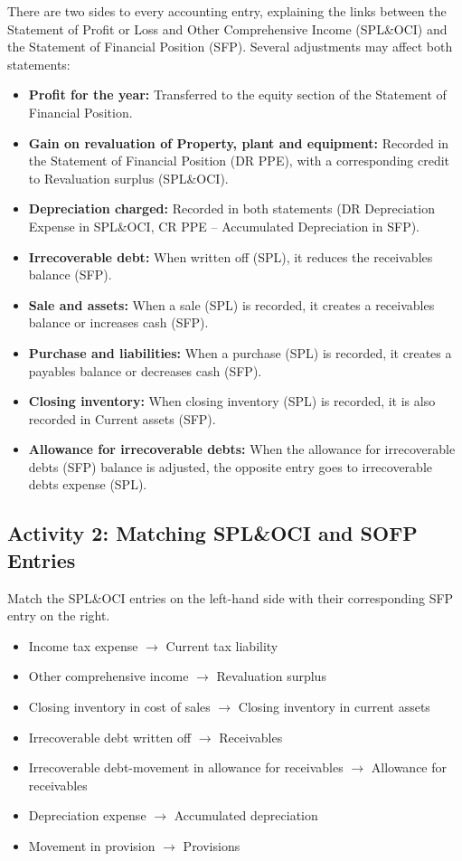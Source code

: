 There are two sides to every accounting entry, explaining the links between the Statement of Profit or Loss and Other Comprehensive Income (SPL\&OCI) and the Statement of Financial Position (SFP). Several adjustments may affect both statements:
\begin{itemize}
    \item \textbf{Profit for the year:} Transferred to the equity section of the Statement of Financial Position.
    \item \textbf{Gain on revaluation of Property, plant and equipment:} Recorded in the Statement of Financial Position (DR PPE), with a corresponding credit to Revaluation surplus (SPL\&OCI).
    \item \textbf{Depreciation charged:} Recorded in both statements (DR Depreciation Expense in SPL\&OCI, CR PPE – Accumulated Depreciation in SFP).
    \item \textbf{Irrecoverable debt:} When written off (SPL), it reduces the receivables balance (SFP).
    \item \textbf{Sale and assets:} When a sale (SPL) is recorded, it creates a receivables balance or increases cash (SFP).
    \item \textbf{Purchase and liabilities:} When a purchase (SPL) is recorded, it creates a payables balance or decreases cash (SFP).
    \item \textbf{Closing inventory:} When closing inventory (SPL) is recorded, it is also recorded in Current assets (SFP).
    \item \textbf{Allowance for irrecoverable debts:} When the allowance for irrecoverable debts (SFP) balance is adjusted, the opposite entry goes to irrecoverable debts expense (SPL).
\end{itemize}

\subsection*{Activity 2: Matching SPL\&OCI and SOFP Entries}
Match the SPL\&OCI entries on the left-hand side with their corresponding SFP entry on the right.
\begin{itemize}
    \item Income tax expense $\rightarrow$ Current tax liability
    \item Other comprehensive income $\rightarrow$ Revaluation surplus
    \item Closing inventory in cost of sales $\rightarrow$ Closing inventory in current assets
    \item Irrecoverable debt written off $\rightarrow$ Receivables
    \item Irrecoverable debt-movement in allowance for receivables $\rightarrow$ Allowance for receivables
    \item Depreciation expense $\rightarrow$ Accumulated depreciation
    \item Movement in provision $\rightarrow$ Provisions
\end{itemize}

